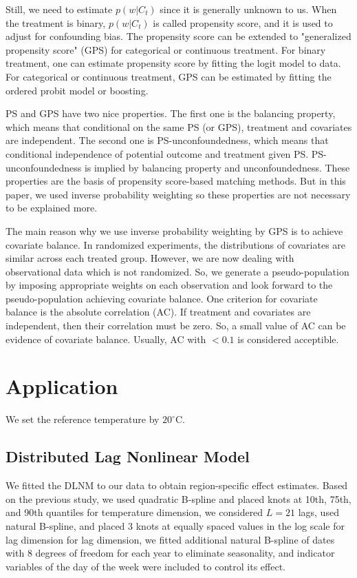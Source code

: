 \documentclass[12pt]{article}
\begin{document}
Still, we need to estimate $p(w\lvert C_t)$ since it is generally unknown to us.
When the treatment is binary, $p(w\lvert C_t)$ is called propensity score,
and it is used to adjust for confounding bias\cite{rosenbaum1983}.
The propensity score can be extended to 
"generalized propensity score" (GPS) for categorical or continuous treatment\cite{imbens2000}.
For binary treatment, one can estimate propensity score by fitting the logit model to data.
For categorical or continuous treatment, GPS can be estimated by fitting the ordered probit model or boosting.

PS and GPS have two nice properties\cite{rosenbaum1983, hirano2004}.
The first one is the balancing property, which means that conditional on the same PS (or GPS),
treatment and covariates are independent.
The second one is PS-unconfoundedness, 
which means that conditional independence of potential outcome and treatment given PS.
PS-unconfoundedness is implied by balancing property and unconfoundedness.
These properties are the basis of propensity score-based matching methods.
But in this paper, 
we used inverse probability weighting so these properties are not necessary to be explained more.

The main reason why we use inverse probability weighting by GPS is to achieve covariate balance.
In randomized experiments, the distributions of covariates are similar across each treated group.
However, we are now dealing with observational data which is not randomized.
So, we generate a pseudo-population by imposing appropriate weights on each observation
and look forward to the pseudo-population achieving covariate balance.
One criterion for covariate balance is the absolute correlation (AC)\cite{gpsboosting2015}.
If treatment and covariates are independent, then their correlation must be zero.
So, a small value of AC can be evidence of covariate balance.
Usually, AC with $ <0.1 $ is considered acceptible.


\section{Application}
\label{section:application}

We set the reference temperature by $20^\circ$C.
\subsection{Distributed Lag Nonlinear Model}

We fitted the DLNM to our data to obtain region-specific effect estimates.
Based on the previous study\cite{gasparrini2015},
we used quadratic B-spline and placed knots at 10th, 75th, and 90th quantiles
for temperature dimension,
we considered $L = 21$ lags, used natural B-spline, 
and placed $3$ knots at equally spaced values in the log scale for lag dimension
for lag dimension,
we fitted additional natural B-spline of dates with $8$ degrees of freedom for each year
to eliminate seasonality,
and indicator variables of the day of the week were included to control its effect.
\end{document}
